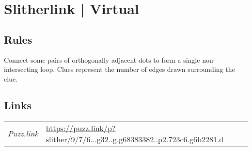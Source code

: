 \section[Slitherlink | Virtual {[\emph{Slitherlink}]}]{Slitherlink | {\normalfont Virtual}}
\label{sec:43-slitherlink-virtual}

\subsection*{Rules}
\begin{markdown}
Connect some pairs of orthogonally adjacent dots to form a single non-intersecting loop. Clues represent the number of edges drawn surrounding the clue.
\end{markdown}
\subsection*{Links}
\begin{tabularx}{\textwidth}{l X}
\emph{Puzz.link} & \url{https://puzz.link/p?slither/9/7/6...g32..g.g68383382..p2.723c6.g6b2281.d} \\
\end{tabularx}
\pagebreak
